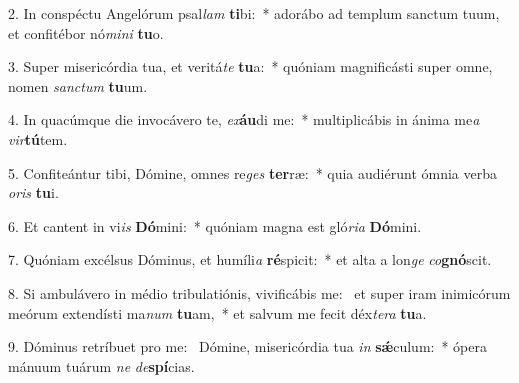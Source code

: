 2. In conspéctu Angelórum psal\textit{lam} \textbf{ti}bi:~*  adorábo ad templum sanctum tuum, et confitébor nó\textit{mi}\textit{ni} \textbf{tu}o.\

3. Super misericórdia tua, et veritá\textit{te} \textbf{tu}a:~*  quóniam magnificásti super omne, nomen \textit{sanc}\textit{tum} \textbf{tu}um.\

4. In quacúmque die invocávero te, \textit{ex}\textbf{áu}di me:~*  multiplicábis in ánima me\textit{a} \textit{vir}\textbf{tú}tem.\

5. Confiteántur tibi, Dómine, omnes re\textit{ges} \textbf{ter}ræ:~*  quia audiérunt ómnia verba \textit{o}\textit{ris} \textbf{tu}i.\

6. Et cantent in vi\textit{is} \textbf{Dó}mini:~*  quóniam magna est gló\textit{ri}\textit{a} \textbf{Dó}mini.\

7. Quóniam excélsus Dóminus, et humíli\textit{a} \textbf{ré}spicit:~*  et alta a lon\textit{ge} \textit{co}\textbf{gnó}scit.\

8. Si ambulávero in médio tribulatiónis, vivificábis me: \dag\  et super iram inimicórum meórum extendísti ma\textit{num} \textbf{tu}am,~*  et salvum me fecit déx\textit{te}\textit{ra} \textbf{tu}a.\

9. Dóminus retríbuet pro me: \dag\  Dómine, misericórdia tua \textit{in} \textbf{sǽ}culum:~*  ópera mánuum tuárum \textit{ne} \textit{de}\textbf{spí}cias.\

